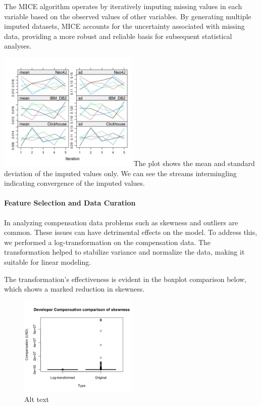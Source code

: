 \documentclass[
  12pt,
]{article}
\begin{document}
The MICE algorithm operates by iteratively imputing missing values in
each variable based on the observed values of other variables. By
generating multiple imputed datasets, MICE accounts for the uncertainty
associated with missing data, providing a more robust and reliable basis
for subsequent statistical analyses.

\includegraphics[width=0.5\textwidth,height=0.5\textheight]{wiggle_plots.png}
The plot shows the mean and standard deviation of the imputed values
only. We can see the streams intermingling indicating convergence of the
imputed values.

\hypertarget{feature-selection-and-data-curation}{%
\paragraph{Feature Selection and Data
Curation}\label{feature-selection-and-data-curation}}

In analyzing compensation data problems such as skewness and outliers
are common. These issues can have detrimental effects on the model. To
address this, we performed a log-transformation on the compensation
data. The transformation helped to stabilize variance and normalize the
data, making it suitable for linear modeling.

The transformation's effectiveness is evident in the boxplot comparison
below, which shows a marked reduction in skewness.

\begin{figure}
\centering
\includegraphics[width=0.5\textwidth,height=0.5\textheight]{comparison_of_skewness.png}
\caption{Alt text}
\end{figure}
\end{document}
